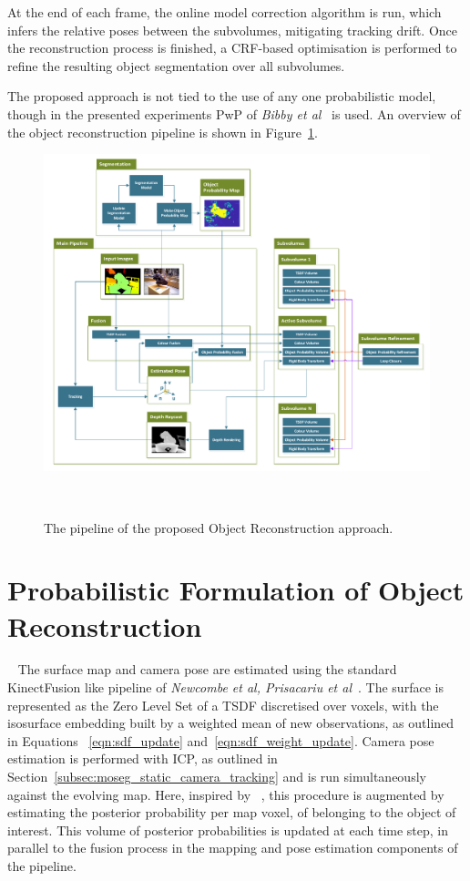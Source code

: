 At the end of each frame, the online model correction algorithm is run, which
infers the relative poses between the subvolumes, mitigating tracking drift.
Once the reconstruction process is finished, a CRF-based optimisation is 
performed to refine the resulting object segmentation over all subvolumes.

The proposed approach is not tied to the use of any one probabilistic model,
though in the presented experiments PwP of \textit{Bibby et al}~\cite{Bibby2008} is used. 
An overview of the object reconstruction pipeline is shown in Figure~\ref{figure:probobj_pipeline_diagram}.
\begin{figure}[!htbp]
  \centering
  \includegraphics[width=\linewidth]{figures/object_recon/pipeline.pdf}
  \caption[Probabilistic Object Reconstruction Pipeline]
  {The pipeline of the proposed Object Reconstruction approach.}
~\label{figure:probobj_pipeline_diagram}
\end{figure}

\section{Probabilistic Formulation of Object Reconstruction}
~\label{sec:probobj_prob_formulation}
The surface map and camera pose are estimated using the standard KinectFusion
like pipeline of \textit{Newcombe et al, Prisacariu et al}~\cite{Newcombe2011,Prisacariu2014}. 
The surface is represented as the Zero Level Set of a TSDF discretised over voxels, with the 
isosurface embedding built by a weighted mean of new observations, as outlined in Equations
~\ref{eqn:sdf_update} and~\ref{eqn:sdf_weight_update}. Camera pose estimation is
performed with ICP, as outlined in Section~\ref{subsec:moseg_static_camera_tracking} 
and is run simultaneously against the evolving map. Here, inspired by 
~\cite{Kolev2006}, this procedure is augmented by estimating the posterior probability 
per map voxel, of belonging to the object of interest. This volume of posterior 
probabilities is updated at each time step, in parallel to the fusion process in the 
mapping and pose estimation components of the pipeline. 

